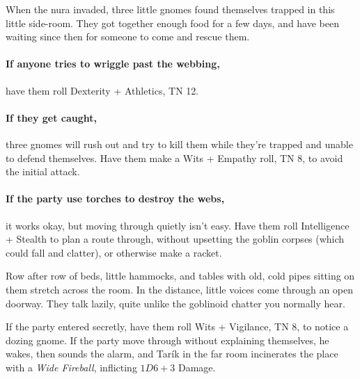 \begin{multicols}{2}
\begin{exampletext}

	When the nura invaded, three little gnomes found themselves trapped in this little side-room.
	They got together enough food for a few days, and have been waiting since then for someone to come and rescue them.

\end{exampletext}

\paragraph{If anyone tries to wriggle past the webbing,}
have them roll Dexterity + Athletics, TN 12.

\paragraph{If they get caught,}
three gnomes will rush out and try to kill them while they're trapped and unable to defend themselves.
Have them make a Wits + Empathy roll, TN 8, to avoid the initial attack.

\paragraph{If the party use torches to destroy the webs,}
it works okay, but moving through quietly isn't easy.
Have them roll Intelligence + Stealth to plan a route through, without upsetting the goblin corpses (which could fall and clatter), or otherwise make a racket.

\label{lounge}

\begin{boxtext}

	Row after row of beds, little hammocks, and tables with old, cold pipes sitting on them stretch across the room.
	In the distance, little voices come through an open doorway.
	They talk lazily, quite unlike the goblinoid chatter you normally hear.

\end{boxtext}

If the party entered secretly, have them roll Wits + Vigilance, TN 8, to notice a dozing gnome.
If the party move through without explaining themselves, he wakes, then sounds the alarm, and Tar\'ik in the far room incinerates the place with a \textit{Wide Fireball}, inflicting $1D6 +3$ Damage.



\end{multicols}
